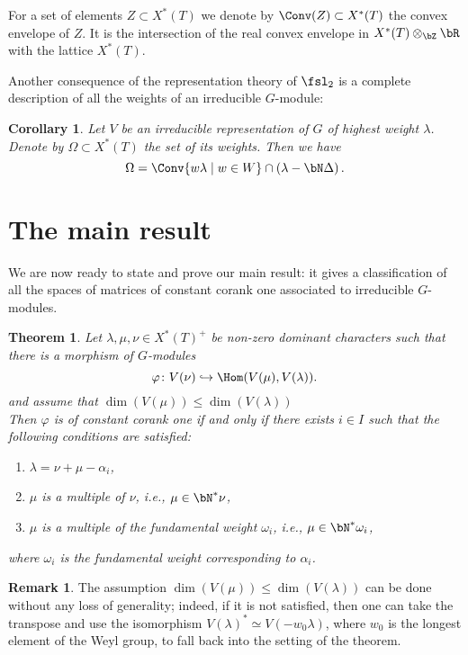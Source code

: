 \documentclass[reqno, 10pt]{amsart}
\theoremstyle{plain}
\newtheorem{theorem}[proposition]{Theorem}
\newtheorem{corollary}[proposition]{Corollary}
\theoremstyle{definition}
\newtheorem{remark}[proposition]{Remark}
\numberwithin{equation}{section}%
\begin{document}
For a set of elements $Z\subset X^*(T)$ we denote by $\Conv(Z)\subset X^*(T)$ the convex envelope of $Z$.
It is the intersection of the real convex envelope in $X^*(T)\otimes_\bZ\bR$ with the lattice $X^*(T)$.

Another consequence of the representation theory of $\fsl_2$ is a complete description of all the weights of an irreducible $G$-module:
\begin{corollary}\label{C:weights of irred rep}
	Let $V$ be an irreducible representation of $G$ of highest weight $\lambda$. Denote by $\Omega\subset X^*(T)$ the set of its weights.
	Then we have
	\[ \Omega =  \Conv\{w\lambda\mid w\in W\} \cap \left(\lambda-\bN\Delta\right).\]
\end{corollary}

\section{The main result} \label{section: main}
We are now ready to state and prove our main result: it gives a classification of all the spaces of matrices of constant corank one associated to irreducible $G$-modules.

\begin{theorem}\label{T:main theorem}
Let $\lambda,\mu,\nu\in X^*(T)^+$ be non-zero dominant characters such that there is a morphism of $G$-modules
\[\varphi\colon V(\nu)\hookrightarrow\Hom(V(\mu),V(\lambda)).\]
and assume that $\dim(V(\mu))\le \dim(V(\lambda))$\\
Then $\varphi$ is of constant corank one if and only if there exists $i\in I$ such that the following
conditions are satisfied:
\begin{enumerate}[label=(\alph*)]
	\item \label{thm-c} $\lambda = \nu+\mu-\alpha_i$,
	\item \label{thm-b} $\mu$ is a multiple of $\nu$, i.e., $\mu\in \bN^*\nu$,
        \item \label{thm-a} $\mu$ is a multiple of the fundamental weight $\omega_i$, i.e., $\mu\in\bN^*\omega_i$,


\end{enumerate}
where $\omega_i$ is the fundamental weight corresponding to $\alpha_i$.
\end{theorem}

\begin{remark}
	The assumption $\dim(V(\mu))\le \dim (V(\lambda))$ can be done without any loss of generality; indeed, if it is not satisfied, then one can take the transpose and use the isomorphism $V(\lambda)^* \simeq V(-w_0\lambda)$, where $w_0$ is the longest element of the Weyl group, to fall back into the setting of the theorem.
\end{remark}
\end{document}
